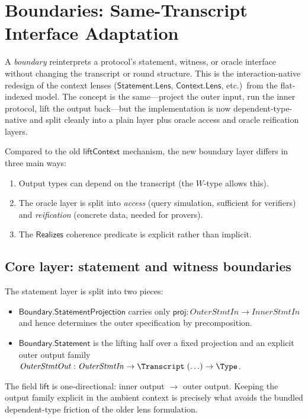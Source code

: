 
\section{Boundaries: Same-Transcript Interface Adaptation}\label{sec:interaction-boundary}

A \emph{boundary} reinterprets a protocol's statement, witness, or oracle
interface without changing the transcript or round structure.  This is the
interaction-native redesign of the context lenses
($\mathsf{Statement.Lens}$, $\mathsf{Context.Lens}$, etc.)\ from the
flat-indexed model.  The concept is the same---project the outer input, run
the inner protocol, lift the output back---but the implementation is now
dependent-type-native and split cleanly into a plain layer plus oracle access
and oracle reification layers.

Compared to the old $\mathsf{liftContext}$ mechanism, the new boundary layer
differs in three main ways:
\begin{enumerate}
  \item Output types can depend on the transcript (the $W$-type allows this).
  \item The oracle layer is split into \emph{access} (query simulation,
    sufficient for verifiers) and \emph{reification} (concrete data, needed
    for provers).
  \item The $\mathsf{Realizes}$ coherence predicate is explicit rather than
    implicit.
\end{enumerate}

\subsection{Core layer: statement and witness boundaries}

\begin{definition}
  \label{int:boundary-statement}
  The statement layer is split into two pieces:
  \begin{itemize}
    \item $\mathsf{Boundary.StatementProjection}$ carries only
      $\mathsf{proj} : \mathit{OuterStmtIn} \to \mathit{InnerStmtIn}$ and hence
      determines the outer specification by precomposition.
    \item $\mathsf{Boundary.Statement}$ is the lifting half over a fixed
      projection and an explicit outer output family
      $\mathit{OuterStmtOut} : \mathit{OuterStmtIn} \to \Transcript\;(\ldots)
      \to \Type$.
  \end{itemize}
  The field $\mathsf{lift}$ is one-directional: inner output $\to$ outer
  output.  Keeping the output family explicit in the ambient context is
  precisely what avoids the bundled dependent-type friction of the older lens
  formulation.
\end{definition}

